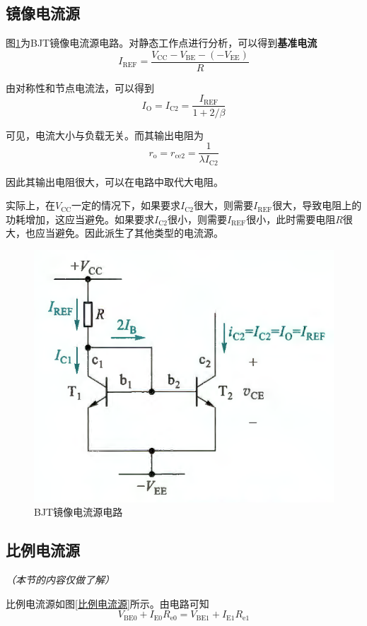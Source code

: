 \subsection{镜像电流源}
图\ref{BJT镜像电流源电路}为BJT镜像电流源电路。对静态工作点进行分析，可以得到\textbf{基准电流}
\begin{equation}
    I_{\mathrm{REF}}=\frac{V_{\mathrm{CC}}-V_{\mathrm{BE}}-(-V_{\mathrm{EE}})}{R}
\end{equation}

由对称性和节点电流法，可以得到
\begin{equation}
    I_\mathrm{O}=I_{\mathrm{C2}}=\frac{I_{\mathrm{REF}}}{1+2/\beta}
\end{equation}

可见，电流大小与负载无关。而其输出电阻为
\begin{equation}
    r_{\mathrm{o}}=r_{\mathrm{ce2}}=\frac{1}{\lambda I_{\mathrm{C2}}}
\end{equation}

因此其输出电阻很大，可以在电路中取代大电阻。

实际上，在$V_{\mathrm{CC}}$一定的情况下，如果要求$I_{\mathrm{C2}}$很大，则需要$I_{\mathrm{REF}}$很大，导致电阻上的功耗增加，这应当避免。如果要求$I_{\mathrm{C2}}$很小，则需要$I_{\mathrm{REF}}$很小，此时需要电阻$R$很大，也应当避免。因此派生了其他类型的电流源。

\begin{figure}[htb]
    \centering
    \includegraphics[width=0.5\linewidth]{pic/BJT镜像电流源电路.png}
    \caption{BJT镜像电流源电路\cite{康华光}\label{BJT镜像电流源电路}}
\end{figure}

\subsection{比例电流源}
\textit{（本节的内容仅做了解）}

比例电流源如图\ref{比例电流源}所示。由电路可知
\begin{equation}
    V_{\mathrm{BE0}}+I_{\mathrm{E0}}R_{\mathrm{e0}}=V_{\mathrm{BE1}}+I_{\mathrm{E1}}R_{\mathrm{e1}}
\end{equation}


